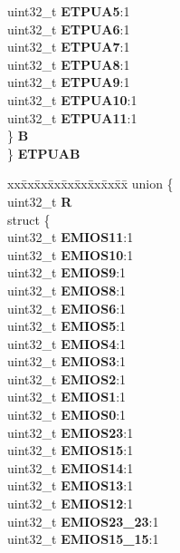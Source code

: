 \begin{DoxyCompactItemize}
\begin{tabbing}
\>\>uint32\_t {\bfseries ETPUA5}:1\\
\>\>uint32\_t {\bfseries ETPUA6}:1\\
\>\>uint32\_t {\bfseries ETPUA7}:1\\
\>\>uint32\_t {\bfseries ETPUA8}:1\\
\>\>uint32\_t {\bfseries ETPUA9}:1\\
\>\>uint32\_t {\bfseries ETPUA10}:1\\
\>\>uint32\_t {\bfseries ETPUA11}:1\\
\>\} {\bfseries B}\\
\} {\bfseries ETPUAB}\\

\end{tabbing}\item 
\mbox{\label{structSIU__tag_aa88750630e618f42abf773a969e18719}} 
\begin{tabbing}
xx\=xx\=xx\=xx\=xx\=xx\=xx\=xx\=xx\=\kill
union \{\\
\>uint32\_t {\bfseries R}\\
\>struct \{\\
\>\>uint32\_t {\bfseries EMIOS11}:1\\
\>\>uint32\_t {\bfseries EMIOS10}:1\\
\>\>uint32\_t {\bfseries EMIOS9}:1\\
\>\>uint32\_t {\bfseries EMIOS8}:1\\
\>\>uint32\_t {\bfseries EMIOS6}:1\\
\>\>uint32\_t {\bfseries EMIOS5}:1\\
\>\>uint32\_t {\bfseries EMIOS4}:1\\
\>\>uint32\_t {\bfseries EMIOS3}:1\\
\>\>uint32\_t {\bfseries EMIOS2}:1\\
\>\>uint32\_t {\bfseries EMIOS1}:1\\
\>\>uint32\_t {\bfseries EMIOS0}:1\\
\>\>uint32\_t {\bfseries EMIOS23}:1\\
\>\>uint32\_t {\bfseries EMIOS15}:1\\
\>\>uint32\_t {\bfseries EMIOS14}:1\\
\>\>uint32\_t {\bfseries EMIOS13}:1\\
\>\>uint32\_t {\bfseries EMIOS12}:1\\
\>\>uint32\_t {\bfseries EMIOS23\_23}:1\\
\>\>uint32\_t {\bfseries EMIOS15\_15}:1\\

\end{tabbing}
\end{DoxyCompactItemize}

